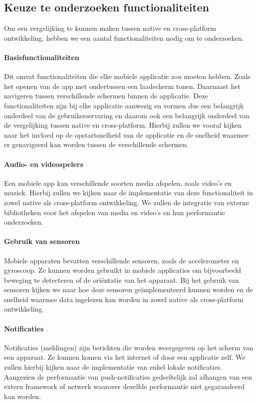 \subsection{Keuze te onderzoeken functionaliteiten}
Om een vergelijking te kunnen maken tussen native en cross-platform ontwikkeling, 
hebben we een aantal functionaliteiten nodig om te onderzoeken. 

\paragraph{Basisfunctionaliteiten}
Dit omvat functionaliteiten die elke mobiele applicatie zou moeten hebben. Zoals 
het openen van de app met ondertussen een laadscherm tonen. Daarnaast het navigeren 
tussen verschillende schermen binnen de applicatie. Deze functionaliteiten zijn bij 
elke applicatie aanwezig en vormen dus een belangrijk onderdeel van de gebruikerservaring 
en daarom ook een belangrijk onderdeel van de vergelijking tussen native en cross-platform.
Hierbij zullen we vooral kijken naar het invloed op de opstartsnelheid van de applicatie 
en de snelheid waarmee er genavigeerd kan worden tussen de verschillende schermen.

\paragraph{Audio- en videospelers}
Een mobiele app kan verschillende soorten media afspelen, zoals video's en muziek. 
Hierbij zullen we kijken naar de implementatie van deze functionaliteit in 
zowel native als cross-platform ontwikkeling. We zullen de integratie van externe bibliotheken 
voor het afspelen van media en video's en hun performantie onderzoeken.

\paragraph{Gebruik van sensoren}
Mobiele apparaten bevatten verschillende sensoren, zoals de accelerometer en gyroscoop. 
Ze kunnen worden gebruikt in mobiele applicaties om bijvoorbeeld beweging te detecteren 
of de oriëntatie van het apparaat. Bij het gebruik van sensoren kijken we naar hoe deze 
sensoren geïmplementeerd kunnen worden en de snelheid waarmee data ingelezen kan worden 
in zowel native als cross-platform ontwikkeling.

\paragraph{Notificaties}
Notificaties (meldingen) zijn berichten die worden weergegeven op het scherm van een 
apparaat. Ze kunnen komen via het internet of door een applicatie zelf. We zullen hierbij 
kijken naar de implementatie van enkel lokale notificaties. Aangezien de performantie van 
push-notificaties gedeeltelijk zal afhangen van een extern framework of netwerk waarover 
dezelfde performantie niet gegarandeerd kan worden.

